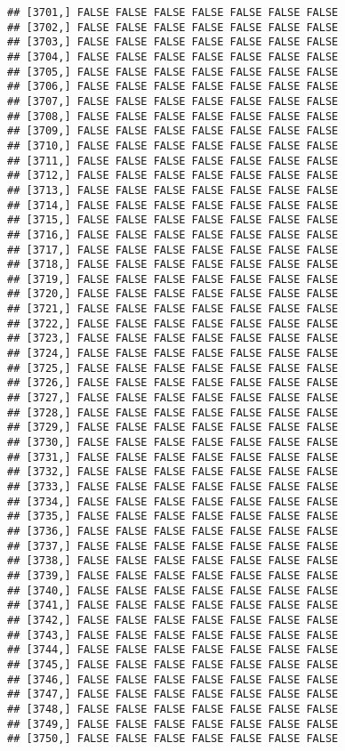 \documentclass[
]{article}
\begin{document}
\begin{verbatim}
## [3701,] FALSE FALSE FALSE FALSE FALSE FALSE FALSE
## [3702,] FALSE FALSE FALSE FALSE FALSE FALSE FALSE
## [3703,] FALSE FALSE FALSE FALSE FALSE FALSE FALSE
## [3704,] FALSE FALSE FALSE FALSE FALSE FALSE FALSE
## [3705,] FALSE FALSE FALSE FALSE FALSE FALSE FALSE
## [3706,] FALSE FALSE FALSE FALSE FALSE FALSE FALSE
## [3707,] FALSE FALSE FALSE FALSE FALSE FALSE FALSE
## [3708,] FALSE FALSE FALSE FALSE FALSE FALSE FALSE
## [3709,] FALSE FALSE FALSE FALSE FALSE FALSE FALSE
## [3710,] FALSE FALSE FALSE FALSE FALSE FALSE FALSE
## [3711,] FALSE FALSE FALSE FALSE FALSE FALSE FALSE
## [3712,] FALSE FALSE FALSE FALSE FALSE FALSE FALSE
## [3713,] FALSE FALSE FALSE FALSE FALSE FALSE FALSE
## [3714,] FALSE FALSE FALSE FALSE FALSE FALSE FALSE
## [3715,] FALSE FALSE FALSE FALSE FALSE FALSE FALSE
## [3716,] FALSE FALSE FALSE FALSE FALSE FALSE FALSE
## [3717,] FALSE FALSE FALSE FALSE FALSE FALSE FALSE
## [3718,] FALSE FALSE FALSE FALSE FALSE FALSE FALSE
## [3719,] FALSE FALSE FALSE FALSE FALSE FALSE FALSE
## [3720,] FALSE FALSE FALSE FALSE FALSE FALSE FALSE
## [3721,] FALSE FALSE FALSE FALSE FALSE FALSE FALSE
## [3722,] FALSE FALSE FALSE FALSE FALSE FALSE FALSE
## [3723,] FALSE FALSE FALSE FALSE FALSE FALSE FALSE
## [3724,] FALSE FALSE FALSE FALSE FALSE FALSE FALSE
## [3725,] FALSE FALSE FALSE FALSE FALSE FALSE FALSE
## [3726,] FALSE FALSE FALSE FALSE FALSE FALSE FALSE
## [3727,] FALSE FALSE FALSE FALSE FALSE FALSE FALSE
## [3728,] FALSE FALSE FALSE FALSE FALSE FALSE FALSE
## [3729,] FALSE FALSE FALSE FALSE FALSE FALSE FALSE
## [3730,] FALSE FALSE FALSE FALSE FALSE FALSE FALSE
## [3731,] FALSE FALSE FALSE FALSE FALSE FALSE FALSE
## [3732,] FALSE FALSE FALSE FALSE FALSE FALSE FALSE
## [3733,] FALSE FALSE FALSE FALSE FALSE FALSE FALSE
## [3734,] FALSE FALSE FALSE FALSE FALSE FALSE FALSE
## [3735,] FALSE FALSE FALSE FALSE FALSE FALSE FALSE
## [3736,] FALSE FALSE FALSE FALSE FALSE FALSE FALSE
## [3737,] FALSE FALSE FALSE FALSE FALSE FALSE FALSE
## [3738,] FALSE FALSE FALSE FALSE FALSE FALSE FALSE
## [3739,] FALSE FALSE FALSE FALSE FALSE FALSE FALSE
## [3740,] FALSE FALSE FALSE FALSE FALSE FALSE FALSE
## [3741,] FALSE FALSE FALSE FALSE FALSE FALSE FALSE
## [3742,] FALSE FALSE FALSE FALSE FALSE FALSE FALSE
## [3743,] FALSE FALSE FALSE FALSE FALSE FALSE FALSE
## [3744,] FALSE FALSE FALSE FALSE FALSE FALSE FALSE
## [3745,] FALSE FALSE FALSE FALSE FALSE FALSE FALSE
## [3746,] FALSE FALSE FALSE FALSE FALSE FALSE FALSE
## [3747,] FALSE FALSE FALSE FALSE FALSE FALSE FALSE
## [3748,] FALSE FALSE FALSE FALSE FALSE FALSE FALSE
## [3749,] FALSE FALSE FALSE FALSE FALSE FALSE FALSE
## [3750,] FALSE FALSE FALSE FALSE FALSE FALSE FALSE

\end{verbatim}
\end{document}
